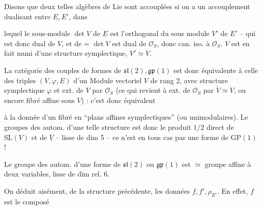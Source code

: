 Disons que deux telles algèbres de Lie  sont accouplées si on a un accouplement dualisant entre $E,E'$, dans


lequel le sous-module $\det V$ de $E$ est l'orthogonal du sous module $V'$ de $E'$ -- qui est donc  dual de $V$, et de = $\det V$ est dual de $\mathscr O_S$, donc can. iso. à $\mathscr O_S$.  $V$ est en fait muni d'une structure symplectique,   $V'\simeq V$.

La catégorie des couples  de formes de $\mathfrak{sl}(2),\mathfrak{gp}(1)$ est donc équivalente à celle des triples $(V,\varphi,E)$ d'un Module vectoriel $V$ de rang 2, avec structure symplectique $\varphi$ et ext. de $V$ par $\mathscr O_S$ (ce qui revient à ext. de $\mathscr O_S$ par $\check V\simeq V$, ou encore fibré affine sous $V$) : c'est donc équivalent

à la donnée d'un fibré en ``plans affines symplectiques'' (ou unimodulaires). Le  groupes des autom. d'une telle structure est donc le produit $1/2$ direct de $\underline{\mathrm{SL}}(V)$ et de $\underline V$ -- lisse de dim 5 -- ce n'est en tous cas pas  une forme de $\mathrm{GP}(1)$ !

Le groupe des autom. d'une forme de $\mathfrak{sl}(2)$ ou $\mathfrak{gp}(1)$ est $\simeq$ groupe affine à deux variables, lisse de dim rel. 6.

On déduit aisément, de la structure précédente, les données $f,f',\rho_{E'}$. En effet, $f$ est le composé

